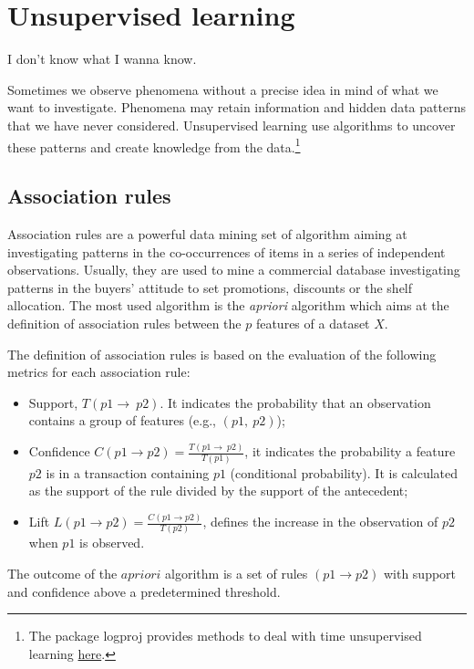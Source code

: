 \chapter{Unsupervised learning}{I don't know what I wanna know.}
\label{chapUnsupervisedLearning}

Sometimes we observe phenomena without a precise idea in mind of what we want to investigate. Phenomena may retain information and hidden data patterns that we have never considered. Unsupervised learning use algorithms to uncover these patterns and create knowledge from the data.\footnote{The package logproj provides methods to deal with time unsupervised learning \href{https://github.com/aletuf93/logproj/blob/master/logproj/ml_unsupervised_models.py}{here}.} 

\section{Association rules} \label{secAssociationRules}
Association rules are a powerful data mining set of algorithm aiming at investigating patterns in the co-occurrences of items in a series of independent observations. Usually, they are used to mine a commercial database investigating patterns in the buyers’ attitude to set promotions, discounts or the shelf allocation. The most used algorithm is the \textit{apriori} algorithm which aims at the definition of association rules between the $p$ features of a dataset $X$.\par

The definition of association rules is based on the evaluation of the following metrics for each association rule:
\begin{itemize}
    \item Support, $T\left(p1\rightarrow\ p2\right)$. It indicates the probability that an observation contains a group of features (e.g., $(p1,\ p2)$);
    \item 	Confidence $C\left(p1\rightarrow p2\right)=\frac{T\left(p1\rightarrow\ p2\right)}{T(p1)}$, it indicates the probability a feature $p2$ is in a transaction containing $p1$ (conditional probability). It is calculated as the support of the rule divided by the support of the antecedent;
    \item 	Lift $L\left(p1\rightarrow p2\right)=\frac{C\left(p1\rightarrow p2\right)}{T(p2)}$, defines the increase in the observation of $p2$ when $p1$ is observed. 
\end{itemize}

The outcome of the $apriori$ algorithm is a set of rules $(p1\rightarrow p2)$ with support and confidence above a predetermined threshold.


